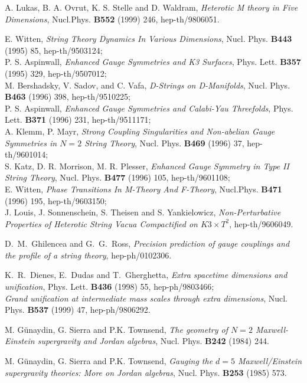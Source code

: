 \documentclass[a4paper,11pt]{article}
\begin{document}
\begin{thebibliography}{99}
  A. Lukas, B. A. Ovrut, K. S. Stelle and D. Waldram,
\emph{Heterotic M theory in Five Dimensions}, Nucl.Phys. \textbf{B552}
(1999)
246, hep-th/9806051.

E. Witten, \emph{String Theory Dynamics In Various Dimensions}, 
Nucl. Phys. \textbf{B443} (1995) 85, hep-th/9503124;\\
P. S. Aspinwall, \emph{Enhanced Gauge Symmetries and K3 Surfaces}, 
 Phys. Lett. \textbf{B357} (1995) 329, hep-th/9507012;\\
M. Bershadsky, V. Sadov, and  C. Vafa, \emph{D-Strings on D-Manifolds},
Nucl. Phys. \textbf{B463} (1996) 398, hep-th/9510225;\\
 P. S. Aspinwall, \emph{Enhanced Gauge 
Symmetries and Calabi-Yau Threefolds},  Phys. Lett. \textbf{B371}
 (1996) 231, hep-th/9511171;\\
 A. Klemm, P. Mayr, \emph{Strong Coupling Singularities and Non-abelian Gauge
Symmetries in $N=2$ String Theory}, Nucl. Phys. \textbf{B469} (1996)
37, hep-th/9601014;\\
S. Katz, D. R. Morrison, M. R. Plesser, \emph{Enhanced 
Gauge Symmetry in Type II String Theory},  Nucl. Phys. \textbf{B477}
 (1996) 105, hep-th/9601108;\\
E. Witten, \emph{Phase Transitions In M-Theory And F-Theory},
Nucl.Phys. \textbf{B471} (1996) 195, hep-th/9603150;\\
J. Louis, J. Sonnenschein, S. Theisen and S. Yankielowicz,
\emph{Non-Perturbative Properties of Heterotic String Vacua Compactified on
$K3 \times T^2$}, hep-th/9606049. 



D.~M.~Ghilencea and G.~G.~Ross,
\emph{Precision prediction of gauge couplings and the profile of a string
theory},
hep-ph/0102306.

K.~R.~Dienes, E.~Dudas and T.~Gherghetta,
\emph{Extra spacetime dimensions and unification},
Phys. Lett. {\bf B436} (1998) 55, hep-ph/9803466;\\
\emph{Grand unification at intermediate mass scales through extra
dimensions},
Nucl. Phys. {\bf B537} (1999) 47, hep-ph/9806292.

 M. G\"{u}naydin, G. Sierra and  P.K. Townsend,
\emph{The geometry of $N=2$ Maxwell-Einstein supergravity and Jordan algebras},
Nucl. Phys. \textbf{B242} (1984) 244.

 M. G\"{u}naydin, G. Sierra and P.K. Townsend, \emph{Gauging
the $d=5$ Maxwell/Einstein supergravity theories: More on Jordan
algebras}, Nucl. Phys.  \textbf{B253} (1985) 573. 


\end{thebibliography}
\end{document}
